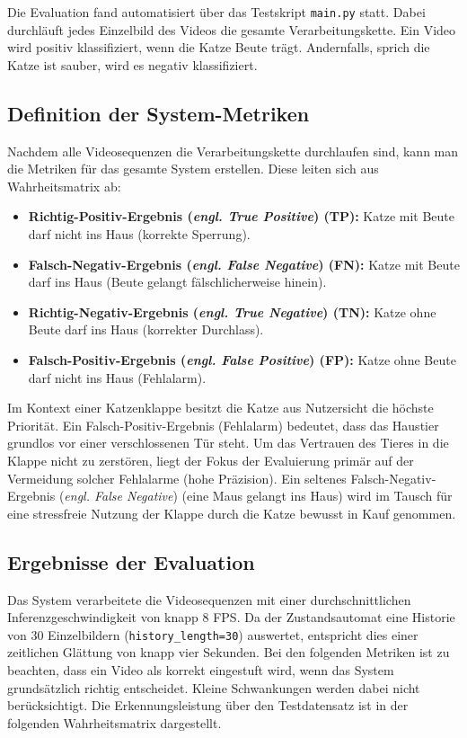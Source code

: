 Die Evaluation fand automatisiert über das Testskript \texttt{main.py} statt. Dabei durchläuft jedes Einzelbild des Videos die gesamte Verarbeitungskette. Ein Video wird positiv klassifiziert, wenn die Katze Beute trägt. Andernfalls, sprich die Katze ist sauber, wird es negativ klassifiziert.

\subsection{Definition der System-Metriken}
Nachdem alle Videosequenzen die Verarbeitungskette durchlaufen sind, kann man die Metriken für das gesamte System erstellen. Diese leiten sich aus Wahrheitsmatrix ab:

\begin{itemize}
    \item \textbf{Richtig-Positiv-Ergebnis (\emph{engl. True Positive}) (TP):} Katze mit Beute darf nicht ins Haus (korrekte Sperrung).
    \item \textbf{Falsch-Negativ-Ergebnis (\emph{engl. False Negative}) (FN):} Katze mit Beute darf ins Haus (Beute gelangt fälschlicherweise hinein).
    \item \textbf{Richtig-Negativ-Ergebnis (\emph{engl. True Negative}) (TN):} Katze ohne Beute darf ins Haus (korrekter Durchlass).
    \item \textbf{Falsch-Positiv-Ergebnis (\emph{engl. False Positive}) (FP):} Katze ohne Beute darf nicht ins Haus (Fehlalarm).
\end{itemize}

Im Kontext einer Katzenklappe besitzt die Katze aus Nutzersicht die höchste Priorität. Ein Falsch-Positiv-Ergebnis (Fehlalarm) bedeutet, dass das Haustier grundlos vor einer verschlossenen Tür steht. Um das Vertrauen des Tieres in die Klappe nicht zu zerstören, liegt der Fokus der Evaluierung primär auf der Vermeidung solcher Fehlalarme (hohe Präzision). Ein seltenes Falsch-Negativ-Ergebnis (\emph{engl. False Negative}) (eine Maus gelangt ins Haus) wird im Tausch für eine stressfreie Nutzung der Klappe durch die Katze bewusst in Kauf genommen.

\subsection{Ergebnisse der Evaluation}
Das System verarbeitete die Videosequenzen mit einer durchschnittlichen Inferenzgeschwindigkeit von knapp 8 FPS. Da der Zustandsautomat eine Historie von 30 Einzelbildern (\texttt{history\_length=30}) auswertet, entspricht dies einer zeitlichen Glättung von knapp vier Sekunden. Bei den folgenden Metriken ist zu beachten, dass ein Video als korrekt eingestuft wird, wenn das System grundsätzlich richtig entscheidet. Kleine Schwankungen werden dabei nicht berücksichtigt. Die Erkennungsleistung über den Testdatensatz ist in der folgenden Wahrheitsmatrix dargestellt.

